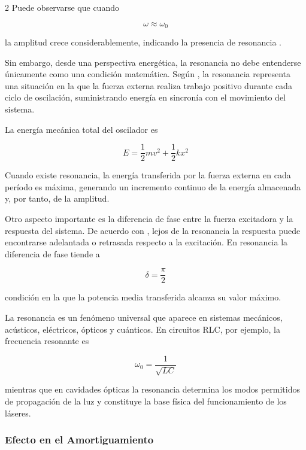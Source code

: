 \documentclass[10pt]{article}
\begin{document}
\begin{multicols}{2}
Puede observarse que cuando

\begin{equation}
\omega \approx \omega_{0}
\end{equation}

la amplitud crece considerablemente, indicando la presencia de resonancia \citep{Peralta2009}.

Sin embargo, desde una perspectiva energética, la resonancia no debe entenderse únicamente como una condición matemática. Según \citet{Feynman2011}, la resonancia representa una situación en la que la fuerza externa realiza trabajo positivo durante cada ciclo de oscilación, suministrando energía en sincronía con el movimiento del sistema.

La energía mecánica total del oscilador es

\begin{equation}
E=\frac{1}{2}mv^{2}+\frac{1}{2}kx^{2}
\end{equation}

Cuando existe resonancia, la energía transferida por la fuerza externa en cada período es máxima, generando un incremento continuo de la energía almacenada y, por tanto, de la amplitud.

Otro aspecto importante es la diferencia de fase entre la fuerza excitadora y la respuesta del sistema. De acuerdo con \citet{French1971}, lejos de la resonancia la respuesta puede encontrarse adelantada o retrasada respecto a la excitación. En resonancia la diferencia de fase tiende a

\begin{equation}
\delta=\frac{\pi}{2}
\end{equation}

condición en la que la potencia media transferida alcanza su valor máximo.

La resonancia es un fenómeno universal que aparece en sistemas mecánicos, acústicos, eléctricos, ópticos y cuánticos. En circuitos RLC, por ejemplo, la frecuencia resonante es

\begin{equation}
\omega_{0}=\frac{1}{\sqrt{LC}}
\end{equation}

mientras que en cavidades ópticas la resonancia determina los modos permitidos de propagación de la luz y constituye la base física del funcionamiento de los láseres.

\subsubsection{Efecto en el Amortiguamiento}


\end{multicols}
\end{document}
